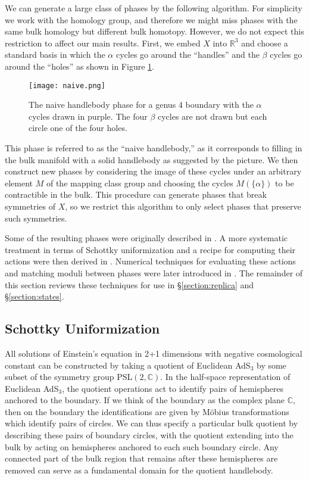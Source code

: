 \documentclass[letterpaper,12pt]{article}
\begin{document}
We can generate a large class of phases by the following algorithm. For simplicity we work with the homology group, and therefore we might miss phases with the same bulk homology but different bulk homotopy. However, we do not expect this restriction to affect our main results. First, we embed $X$ into $\mathbb R^3$ and choose a standard basis in which the $\alpha$ cycles go around the ``handles'' and the $\beta$ cycles go around the ``holes'' as shown in Figure \ref{fig:naive}.
\begin{figure}[ht!]
\centering
\texttt{[image: naive.png]}
\caption{
The naive handlebody phase for a genus 4 boundary with the $\alpha$ cycles drawn in purple. The four $\beta$ cycles are not drawn but each circle one of the four holes. \label{fig:naive}
}
\end{figure}
This phase is referred to as the ``naive handlebody,'' as it corresponds to filling in the bulk manifold with a solid handlebody as suggested by the picture. We then construct new phases by considering the image of these cycles under an arbitrary element $M$ of the mapping class group and choosing the cycles $M(\{\alpha\})$ to be contractible in the bulk. This procedure can generate phases that break symmetries of $X$, so we restrict this algorithm to only select phases that preserve such symmetries.

Some of the resulting phases were originally described in \cite{Brill1,Brill2}. A more systematic treatment in terms of Schottky uniformization and a recipe for computing their actions were then derived in \cite{Krasnov1, Krasnov2}. Numerical techniques for evaluating these actions and matching moduli between phases were later  introduced in \cite{MRW}. The remainder of this section reviews these techniques for use in \S\ref{section:replica} and \S\ref{section:states}.

\subsection{Schottky Uniformization}

All solutions of Einstein's equation in 2+1 dimensions with negative cosmological constant can be constructed by taking a quotient of Euclidean AdS$_3$ by some subset of the symmetry group PSL$(2,\mathbb C)$. In the half-space representation of Euclidean AdS$_3$, the quotient operations act to identify pairs of hemispheres anchored to the boundary. If we think of the boundary as the complex plane $\mathbb C$, then on the boundary the identifications are given by M\"obius transformations which identify pairs of circles. We can thus specify a particular bulk quotient by describing these pairs of boundary circles, with the quotient extending into the bulk by acting on hemispheres anchored to each such boundary circle. Any connected part of the bulk region that remains after these hemispheres are removed can serve as a fundamental domain for the quotient handlebody.
\end{document}
